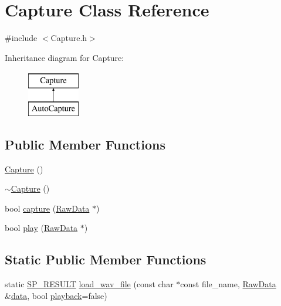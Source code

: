 \hypertarget{class_capture}{\section{Capture Class Reference}
\label{class_capture}
}


{\ttfamily \#include $<$Capture.\+h$>$}

Inheritance diagram for Capture\+:\begin{figure}[H]
\begin{center}
\leavevmode
\includegraphics[height=2.000000cm]{class_capture}
\end{center}
\end{figure}
\subsection*{Public Member Functions}
\begin{DoxyCompactItemize}
\item 
\hyperlink{class_capture_a97036b5d271238bd4852da79a0091b57}{Capture} ()
\item 
\hyperlink{class_capture_ab5b3fac467fa47592126d782f9375250}{$\sim$\+Capture} ()
\item 
bool \hyperlink{class_capture_a3093205d35063cabcc642f2f1974298e}{capture} (\hyperlink{class_raw_data}{Raw\+Data} $\ast$)
\item 
bool \hyperlink{class_capture_a255daf1ddd78a6593b0e4850b39a9ec9}{play} (\hyperlink{class_raw_data}{Raw\+Data} $\ast$)
\end{DoxyCompactItemize}
\subsection*{Static Public Member Functions}
\begin{DoxyCompactItemize}
\item 
static \hyperlink{tool_8h_ab71a1f2fb85a32402ced5c483105b38e}{S\+P\+\_\+\+R\+E\+S\+U\+L\+T} \hyperlink{class_capture_a45364e6153b09910c64006b4dee2e3ba}{load\+\_\+wav\+\_\+file} (const char $\ast$const file\+\_\+name, \hyperlink{class_raw_data}{Raw\+Data} \&\hyperlink{readwave_8h_aa12fa7025612e5f4774f2412dd7f465b}{data}, bool \hyperlink{recorder_8cpp_afca07e4c3b4c5d94f98ac43562d19215}{playback}=false)
\end{DoxyCompactItemize}
